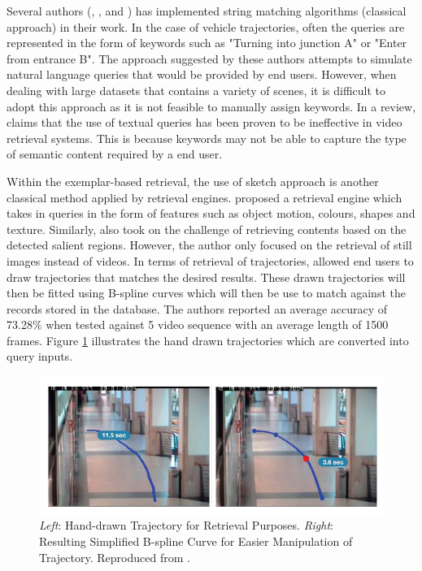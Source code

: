 Several authors (, \cite{momin2015vehicle}, and \cite{yang2015semantic}) has implemented string matching algorithms (classical approach) in their work. In the case of vehicle trajectories, often the queries are represented in the form of keywords such as "Turning into junction A" or "Enter from entrance B". The approach suggested by these authors attempts to simulate natural language queries that would be provided by end users. However, when dealing with large datasets that contains a variety of scenes, it is difficult to adopt this approach as it is not feasible to manually assign keywords. In a review,  claims that the use of textual queries has been proven to be ineffective in video retrieval systems. This is because keywords may not be able to capture the type of semantic content required by a end user.

Within the exemplar-based retrieval, the use of sketch approach is another classical method applied by retrieval engines.
 proposed a retrieval engine which takes in queries in the form of features such as object motion, colours, shapes and texture. Similarly,  also took on the challenge of retrieving contents based on the detected salient regions. However, the author only focused on the retrieval of still images instead of videos. In terms of retrieval of trajectories,  allowed end users to draw trajectories that matches the desired results. These drawn trajectories will then be fitted using B-spline curves which will then be use to match against the records stored in the database. The authors reported an average accuracy of 73.28\% when tested against 5 video sequence with an average length of 1500 frames. Figure \ref{fig:drawquery1} illustrates the hand drawn trajectories which are converted into query inputs.


\begin{figure}[hbt!]\centering
\includegraphics[width=.9\textwidth]{image/lit/trajdraw1.PNG}
\caption[\textit{Left}: Hand-drawn Trajectory for Retrieval Purposes. \textit{Right}: Resulting Simplified B-spline Curve for Easier Manipulation of Trajectory. ]
{\textit{Left}: Hand-drawn Trajectory for Retrieval Purposes. \textit{Right}: Resulting Simplified B-spline Curve for Easier Manipulation of Trajectory.
Reproduced from .}
\label{fig:drawquery1}
\end{figure}

